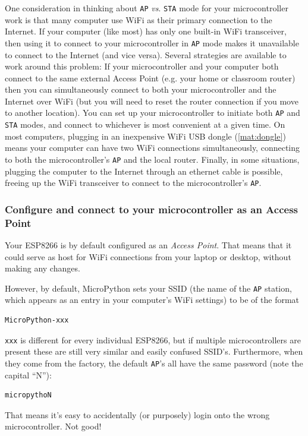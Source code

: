 One consideration in thinking about \texttt{AP} \textit{vs}. \texttt{STA} mode for your microcontroller work is that many computer use WiFi as their primary connection to the Internet.
If your computer (like most) has only one built-in WiFi transceiver, then using it to connect to your microcontroller in \texttt{AP} mode makes it unavailable to connect to the Internet (and vice versa).
Several strategies are available to work around this problem:
If your microcontroller and your computer both connect to the same external Access Point (e.g. your home or classroom router) then you can simultaneously connect to both your microcontroller and the Internet over WiFi (but you will need to reset the router connection if you move to another location).
You can set up your microcontroller to initiate both \texttt{AP} and \texttt{STA} modes, and connect to whichever is most convenient at a given time.
On most computers, plugging in an inexpensive WiFi USB dongle (\ref{mat:dongle}) means your computer can have two WiFi connections simultaneously, connecting to both the microcontroller's \texttt{AP} and the local router.
Finally, in some situations, plugging the computer to the Internet through an ethernet cable is possible, freeing up the WiFi transceiver to connect to the microcontroller's \texttt{AP}.

\subsubsection{\howto Configure and connect to your microcontroller as an Access Point}
Your ESP8266 is by default configured as an \emph{Access Point}.
That means that it could serve as host for WiFi connections from your laptop or desktop, without making any changes.

However, by default, MicroPython sets your SSID (the name of the \texttt{AP} station, which appears as an entry in your computer's WiFi settings) to be of the format
\begin{lstlisting}[language=bash]
MicroPython-xxx
\end{lstlisting}
\verb|xxx| is different for every individual ESP8266, but if multiple microcontrollers are present these are still very similar and easily confused SSID's.
Furthermore, when they come from the factory, the default \texttt{AP}'s all have the same password (note the capital ``N''):
\begin{lstlisting}[language=bash]
micropythoN
\end{lstlisting}
That means it's easy to accidentally (or purposely) login onto the wrong microcontroller.
Not good!


